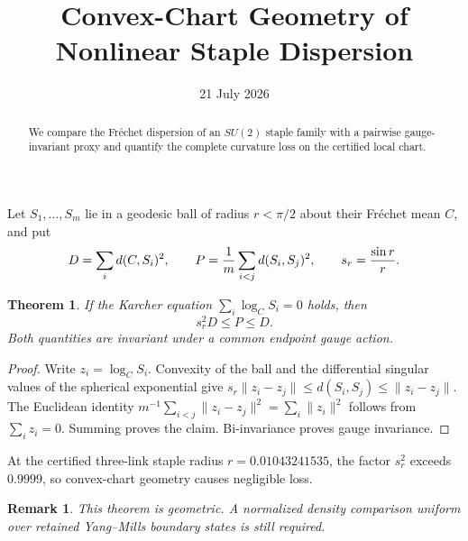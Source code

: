 \documentclass[11pt]{article}\usepackage[margin=1in]{geometry}\usepackage{amsmath,amssymb,amsthm}\newtheorem{theorem}{Theorem}\newtheorem{remark}{Remark}
\title{Convex-Chart Geometry of Nonlinear Staple Dispersion}\author{}\date{21 July 2026}
\begin{document}
\maketitle
\begin{abstract}We compare the Fr\'echet dispersion of an $SU(2)$ staple family with a pairwise gauge-invariant proxy and quantify the complete curvature loss on the certified local chart.\end{abstract}
Let $S_1,\ldots,S_m$ lie in a geodesic ball of radius $r<\pi/2$ about their Fr\'echet mean $C$, and put
\[D=\sum_i d(C,S_i)^2,\qquad P={1\over m}\sum_{i<j}d(S_i,S_j)^2,\qquad s_r={\sin r\over r}.\]
\begin{theorem}If the Karcher equation $\sum_i\log_C S_i=0$ holds, then
\[s_r^2D\le P\le D.\]
Both quantities are invariant under a common endpoint gauge action.\end{theorem}
\begin{proof}Write $z_i=\log_C S_i$. Convexity of the ball and the differential singular values of the spherical exponential give
$s_r\|z_i-z_j\|\le d(S_i,S_j)\le\|z_i-z_j\|$. The Euclidean identity $m^{-1}\sum_{i<j}\|z_i-z_j\|^2=\sum_i\|z_i\|^2$ follows from $\sum_i z_i=0$. Summing proves the claim. Bi-invariance proves gauge invariance.\end{proof}
At the certified three-link staple radius $r=0.01043241535$, the factor $s_r^2$ exceeds $0.9999$, so convex-chart geometry causes negligible loss.
\begin{remark}This theorem is geometric. A normalized density comparison uniform over retained Yang--Mills boundary states is still required.\end{remark}
\end{document}
